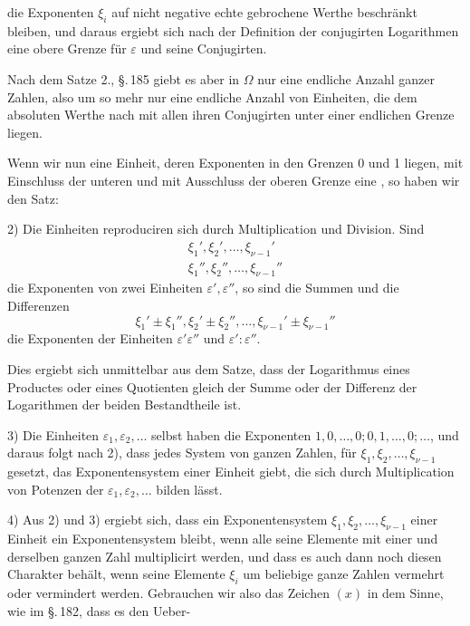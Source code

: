 die Exponenten $\xi_i$ auf nicht negative echte gebrochene Werthe beschr\"ankt bleiben, und daraus ergiebt sich nach der Definition der conjugirten Logarithmen eine obere Grenze f\"ur $\varepsilon$ und seine Conjugirten.

Nach dem Satze 2., \S.\,185 giebt es aber in $\Omega$ nur eine endliche Anzahl ganzer Zahlen, also um so mehr nur eine endliche Anzahl von Einheiten, die dem absoluten Werthe nach mit allen ihren Conjugirten unter einer endlichen Grenze liegen.

Wenn wir nun eine Einheit, deren Exponenten in den Grenzen 0 und 1 liegen, mit Einschluss der unteren und mit Ausschluss der oberen Grenze eine , so haben wir den Satz:


2) Die Einheiten reproduciren sich durch Multiplication und Division. Sind
\[
\begin{array}{l}
\xi_1', \xi_2', \ldots, \xi_{\nu-1}' \\
\xi_1'', \xi_2'', \ldots, \xi_{\nu-1}''
\end{array}
\]
die Exponenten von zwei Einheiten $\varepsilon', \varepsilon''$, so sind die Summen und die Differenzen
\[
\xi_1' \pm \xi_1'', \xi_2' \pm \xi_2'', \ldots, \xi_{\nu-1}' \pm \xi_{\nu-1}''
\]
die Exponenten der Einheiten $\varepsilon' \varepsilon''$ und $\varepsilon' : \varepsilon''$.

Dies ergiebt sich unmittelbar aus dem Satze, dass der Logarithmus eines Productes oder eines Quotienten gleich der Summe oder der Differenz der Logarithmen der beiden Bestandtheile ist.

3) Die Einheiten $\varepsilon_1, \varepsilon_2, \ldots$ selbst haben die Exponenten $1, 0, \ldots, 0; 0, 1, \ldots, 0; \ldots$, und daraus folgt nach 2), dass jedes System von ganzen Zahlen, f\"ur $\xi_1, \xi_2, \ldots, \xi_{\nu-1}$ gesetzt, das Exponentensystem einer Einheit giebt, die sich durch Multiplication von Potenzen der $\varepsilon_1, \varepsilon_2, \ldots$ bilden l\"asst.

4) Aus 2) und 3) ergiebt sich, dass ein Exponentensystem $\xi_1, \xi_2, \ldots, \xi_{\nu-1}$ einer Einheit ein Exponentensystem bleibt, wenn alle seine Elemente mit einer und derselben ganzen Zahl multiplicirt werden, und dass es auch dann noch diesen Charakter beh\"alt, wenn seine Elemente $\xi_i$ um beliebige ganze Zahlen vermehrt oder vermindert werden. Gebrauchen wir also das Zeichen $(x)$ in dem Sinne, wie im \S.\,182, dass es den Ueber-
